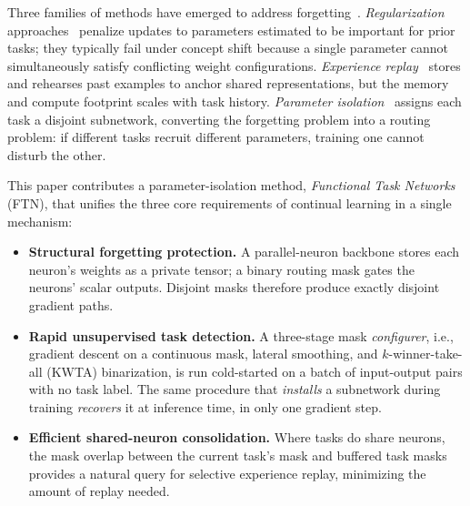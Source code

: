 \documentclass{article}
\begin{document}
Three families of methods have emerged to address forgetting~\citep{parisi2019continual}. \emph{Regularization} approaches~\citep{kirkpatrick2017overcoming,zenke2017continual} penalize updates to parameters estimated to be important for prior tasks; they typically fail under concept shift because a single parameter cannot simultaneously satisfy conflicting weight configurations. \emph{Experience replay}~\citep{rebuffi2017icarl,lopez2017gradient} stores and rehearses past examples to anchor shared representations, but the memory and compute footprint scales with task history. \emph{Parameter isolation}~\citep{mallya2018packnet,serra2018overcoming,wortsman2020supermasks,rusu2016progressive,yoon2018lifelong} assigns each task a disjoint subnetwork, converting the forgetting problem into a routing problem: if different tasks recruit different parameters, training one cannot disturb the other.

This paper contributes a parameter-isolation method, \emph{Functional Task Networks} (FTN), that unifies the three core requirements of continual learning in a single mechanism:
\begin{itemize}
  \item \textbf{Structural forgetting protection.} A parallel-neuron backbone stores each neuron's weights as a private tensor; a binary routing mask gates the neurons' scalar outputs. Disjoint masks therefore produce exactly disjoint gradient paths.
  \item \textbf{Rapid unsupervised task detection.} A three-stage mask \emph{configurer}, i.e., gradient descent on a continuous mask, lateral smoothing, and $k$-winner-take-all (KWTA) binarization, is run cold-started on a batch of input-output pairs with no task label. The same procedure that \emph{installs} a subnetwork during training \emph{recovers} it at inference time, in only one gradient step.
  \item \textbf{Efficient shared-neuron consolidation.} Where tasks do share neurons, the mask overlap between the current task's mask and buffered task masks provides a natural query for selective experience replay, minimizing the amount of replay needed.
\end{itemize}
\end{document}
